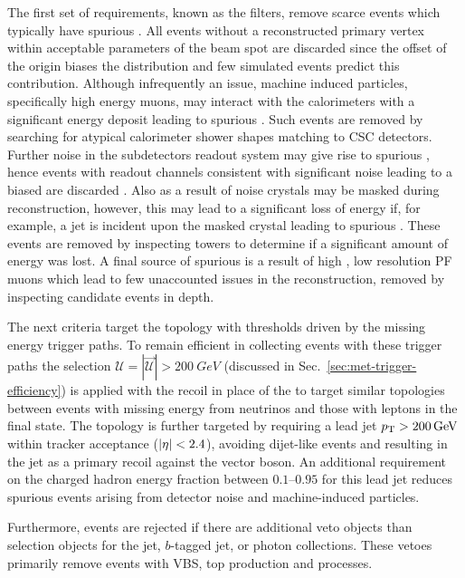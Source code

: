 The first set of requirements, known as the \ptmiss filters, remove scarce events which typically have spurious \ptmiss. All events without a reconstructed primary vertex within acceptable parameters of the beam spot are discarded since the offset of the origin biases the \ptmiss distribution and few simulated events predict this contribution. Although infrequently an issue, machine induced particles, specifically high energy muons, may interact with the calorimeters with a significant energy deposit leading to spurious \ptmiss. Such events are removed by searching for atypical calorimeter shower shapes matching to CSC detectors. Further noise in the \HCAL subdetectors readout system may give rise to spurious \ptmiss, hence events with \HCAL readout channels consistent with significant noise leading to a biased \ptmiss are discarded \cite{CMS-DP-2016-061}. Also as a result of noise \ECAL crystals may be masked during reconstruction, however, this may lead to a significant loss of energy if, for example, a jet is incident upon the masked crystal leading to spurious \ptmiss. These events are removed by inspecting \HWT towers to determine if a significant amount of energy was lost. A final source of spurious \ptmiss is a result of high \pt, low resolution PF muons which lead to few unaccounted issues in the reconstruction, removed by inspecting candidate events in depth.

The next criteria target the \metplusjets topology with thresholds driven by the missing energy trigger paths. To remain efficient in collecting events with these trigger paths the selection ${\mathcal{U}=|\vec{\mathcal{U}}|>\SI{200}{GeV}}$ (discussed in Sec.~\ref{sec:met-trigger-efficiency}) is applied with the recoil in place of the \ptmiss to target similar topologies between events with missing energy from neutrinos and those with leptons in the final state. The topology is further targeted by requiring a lead jet ${p_{\text{T}}>\SI{200}{GeV}}$ within tracker acceptance (${|\eta|<2.4}$), avoiding dijet-like events and resulting in the jet as a primary recoil against the vector boson. An additional requirement on the charged hadron energy fraction between {$0.1$--$0.95$} for this lead jet reduces spurious \ptmiss events arising from detector noise and machine-induced particles.

Furthermore, events are rejected if there are additional veto objects than selection objects for the jet, $b$-tagged jet, or photon collections. These vetoes primarily remove events with VBS, top production and \Igj processes.

